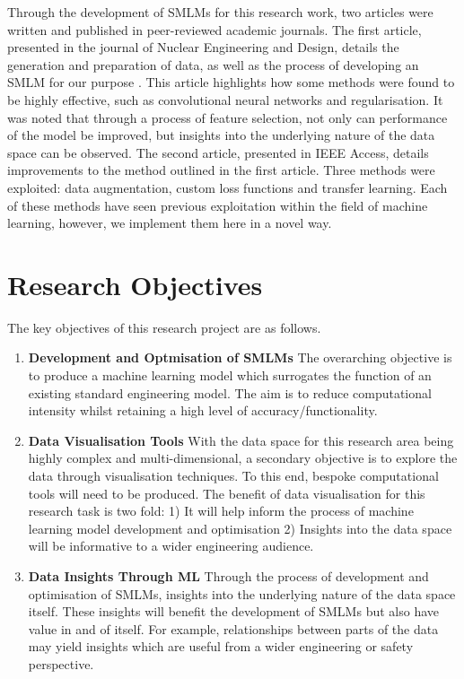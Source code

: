 \noindent
Through the development of SMLMs for this research work, two articles were written and published in peer-reviewed academic journals. The first article, presented in the journal of Nuclear Engineering and Design, details the generation and preparation of data, as well as the process of developing an SMLM for our purpose \cite{jones2022surrogate}. This article highlights how some methods were found to be highly effective, such as convolutional neural networks and regularisation. It was noted that through a process of feature selection, not only can performance of the model be improved, but insights into the underlying nature of the data space can be observed. The second article, presented in IEEE Access, details improvements to the method outlined in the first article. Three methods were exploited: data augmentation, custom loss functions and transfer learning. Each of these methods have seen previous exploitation within the field of machine learning, however, we implement them here in a novel way. 


\section{Research Objectives}

The key objectives of this research project are as follows.

\begin{enumerate}
	\item \textbf{Development and Optmisation of SMLMs} The overarching objective is to produce a machine learning model which surrogates the function of an existing standard engineering model. The aim is to reduce computational intensity whilst retaining a high level of accuracy/functionality. 
	
	\item \textbf{Data Visualisation Tools} With the data space for this research area being highly complex and multi-dimensional, a secondary objective is to explore the data through visualisation techniques. To this end, bespoke computational tools will need to be produced. The benefit of data visualisation for this research task is two fold: 1) It will help inform the process of machine learning model development and optimisation 2) Insights into the data space will be informative to a wider engineering audience.
	
	\item \textbf{Data Insights Through ML} Through the process of development and optimisation of SMLMs, insights into the underlying nature of the data space itself. These insights will benefit the development of SMLMs but also have value in and of itself. For example, relationships between parts of the data may yield insights which are useful from a wider engineering or safety perspective. 
	
	
\end{enumerate}



